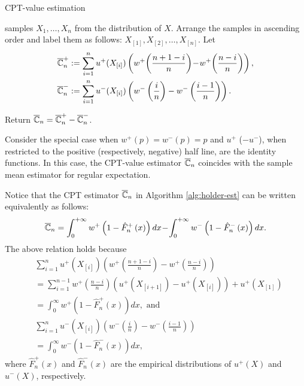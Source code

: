 \begin{algorithm}
\caption{CPT-value estimation}
\label{alg:holder-est}
\begin{algorithmic}[1]
      samples $X_1,\ldots,X_n$ from the distribution of $X$.
\State Arrange the samples in ascending order and label them as follows: 
$X_{[1]}, X_{[2]}, \ldots ,X_{[n]}$. 
\State Let
\vspace{-0.5ex}
\begin{align*}
\overline {\mathbb{C}}_n^+&:=\sum_{i=1}^{n} u^+(X_{[i]}) \left(w^+\!\left(\frac{n+1-i}{n}\right)\!-\! w^+\!\left(\frac{n-i}{n}\right) \right),\\
\overline {\mathbb{C}}_n^-&:=\sum_{i=1}^{n} u^-(X_{[i]}) \left(w^-\left(\frac{i}{n}\right)- w^-\left(\frac{i-1}{n}\right) \right). 
\end{align*}

\vspace{-0.5ex}
\State Return $\overline {\mathbb{C}}_n =\overline {\mathbb{C}}_n^+ - \overline {\mathbb{C}}_n^-$.
\end{algorithmic}
\end{algorithm}

Consider the special case when $w^+(p)=w^-(p)=p$ and $u^+$ ($-u^-$), when restricted to the positive (respectively, negative) half line, are the identity functions. In this case, the CPT-value estimator $\overline {\mathbb{C}}_n$ coincides with the sample mean estimator for regular expectation. 

Notice that the CPT estimator $\overline {\mathbb{C}}_n$ in Algorithm \ref{alg:holder-est} can be written equivalently as follows:
\begin{align}
\overline {\mathbb{C}}_n = \int_0^{+\infty} w^+\left(1-{\hat F_n}^+\left(x\right)\right)  dx \!-\! \int_0^{+\infty} w^-\left(1-{\hat F_n}^-\left(x\right)\right)  dx.
\label{eq:cpt-est-appendix}
\end{align}
The above relation holds because 
\begin{align*}
&\sum_{i=1}^{n} u^+\left(X_{[i]}\right) \left(w^+\left(\frac{n+1-i}{n}\right) - w^+\left(\frac{n-i}{n}\right)\right) \\
&= \sum_{i=1}^{n-1} w^+\left(\frac{n-i}{n}\right) \left(u^+\left(X_{[i+1]}\right) - u^+\left(X_{[i]} \right)\right) + u^+(X_{[1]})\\
&=  \int_0^{\infty} w^+\left(1-\hat{F}^+_n\left(x\right)\right) dx, \text{ and }\\
&\sum_{i=1}^{n} u^-\left(X_{[i]}\right) \left(w^-\left(\frac{i}{n}\right) - w^-\left(\frac{i-1}{n}\right)\right)\\
& =  \int_0^{\infty} w^-\left(1-\hat{F}^-_n\left(x\right)\right) dx, 
\end{align*}
where $\hat{F}^+_n\left(x\right)$ and $\hat{F}^-_n\left(x\right)$ are the empirical distributions of $u^+\left(X\right)$
and $u^-\left(X\right)$, respectively.


